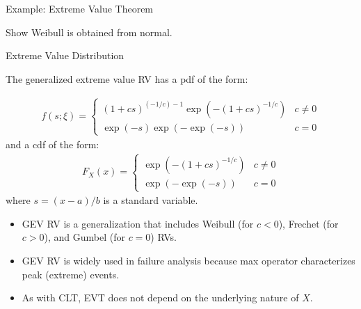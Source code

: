 \documentclass[9pt]{beamer}
\begin{document}
%
\begin{frame}{Example: Extreme Value Theorem}

\begin{block}{}
{\color{red} Show Weibull is obtained from normal.}
\end{block}

\end{frame}

%
\begin{frame}{Extreme Value Distribution}

The generalized extreme value RV has a pdf of the form:
\begin{block}{}
\begin{align*}
f(s;\xi) = \begin{cases}(1+c s)^{(-1/c)-1} \exp(-(1+c s)^{-1/c}) & c\neq0 \\
\exp(-s) \exp(-\exp(-s)) & c = 0\end{cases}
\end{align*}
and a cdf of the form:
\begin{align*}
F_X(x)= \begin{cases}\exp(-(1+c s)^{-1/c}) & c\neq0 \\ \exp(-\exp(-s)) & c = 0\end{cases}
\end{align*}
where $s=(x-a)/b$ is a standard variable. 
\end{block}
\begin{itemize}
\item GEV RV is a generalization that includes Weibull (for $c<0$), Frechet (for $c>0$), and Gumbel (for $c=0$) RVs. 


\item GEV RV is widely used in failure analysis because max operator characterizes peak (extreme) events. 

\item As with CLT,  EVT does not depend on the underlying nature of $X$. 

\end{itemize}


\end{frame}
\end{document}
